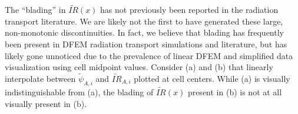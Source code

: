 The ``blading'' in $\widetilde{IR}(x)$ has not previously been reported in the radiation transport literature.
We are likely not the first to have generated these large, non-monotonic discontinuities. 
In fact, we believe that blading has frequently been present in DFEM radiation transport simulations and literature, but has likely gone unnoticed due to the prevalence of linear DFEM and simplified data visualization using cell midpoint values.
Consider (a) and (b) that linearly interpolate between $\widetilde{\psi}_{A,i}$ and  $\widetilde{IR}_{A,i}$ plotted at cell centers.
While (a) is visually indistinguishable from (a), the blading of $\widetilde{IR}(x)$ present in (b) is not at all visually present in (b).
%

